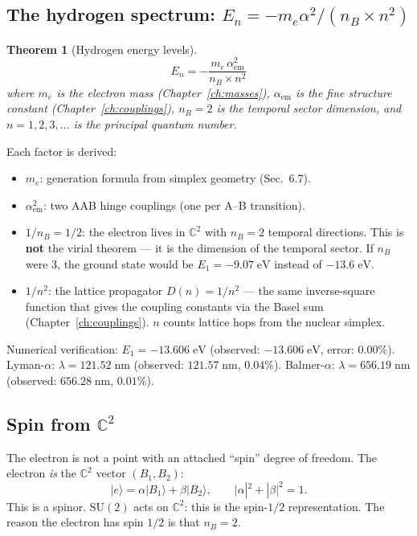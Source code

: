 \documentclass[12pt]{article}
\newtheorem{theorem}{Theorem}[section]
\theoremstyle{remark}
\theoremstyle{definition}
\newcommand{\CC}{\mathbb{C}}
\begin{document}
\subsection{The hydrogen spectrum: $E_n = -m_e\alpha^2/(n_B \times n^2)$}

\begin{theorem}[Hydrogen energy levels]
\begin{equation}
\boxed{E_n = -\frac{m_e\,\alpha_\text{em}^2}{n_B \times n^2}}
\end{equation}
where $m_e$ is the electron mass (Chapter~\ref{ch:masses}), $\alpha_\text{em}$ is the fine structure constant (Chapter~\ref{ch:couplings}), $n_B = 2$ is the temporal sector dimension, and $n = 1, 2, 3, \ldots$ is the principal quantum number.
\end{theorem}

Each factor is derived:
\begin{itemize}
\item $m_e$: generation formula from simplex geometry (Sec.~6.7).
\item $\alpha_\text{em}^2$: two AAB hinge couplings (one per A--B transition).
\item $1/n_B = 1/2$: the electron lives in $\CC^2$ with $n_B = 2$ temporal directions. This is \textbf{not} the virial theorem --- it is the dimension of the temporal sector. If $n_B$ were 3, the ground state would be $E_1 = -9.07\;\text{eV}$ instead of $-13.6\;\text{eV}$.
\item $1/n^2$: the lattice propagator $D(n) = 1/n^2$ --- the same inverse-square function that gives the coupling constants via the Basel sum (Chapter~\ref{ch:couplings}). $n$ counts lattice hops from the nuclear simplex.
\end{itemize}

Numerical verification: $E_1 = -13.606\;\text{eV}$ (observed: $-13.606\;\text{eV}$, error: $0.00\%$). Lyman-$\alpha$: $\lambda = 121.52\;\text{nm}$ (observed: $121.57\;\text{nm}$, $0.04\%$). Balmer-$\alpha$: $\lambda = 656.19\;\text{nm}$ (observed: $656.28\;\text{nm}$, $0.01\%$).

\subsection{Spin from $\CC^2$}

The electron is not a point with an attached ``spin'' degree of freedom. The electron \emph{is} the $\CC^2$ vector $(B_1, B_2)$:
\begin{equation}
|e\rangle = \alpha|B_1\rangle + \beta|B_2\rangle, \qquad |\alpha|^2 + |\beta|^2 = 1.
\end{equation}
This is a spinor. $\text{SU}(2)$ acts on $\CC^2$: this is the spin-$1/2$ representation. The reason the electron has spin $1/2$ is that $n_B = 2$.
\end{document}
